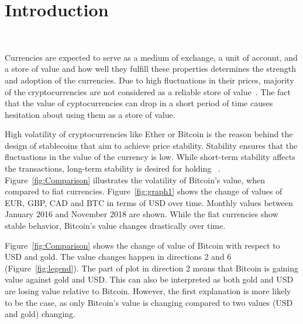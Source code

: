 \section{Introduction}\label{Intro}
~

Currencies are expected to serve as a medium of exchange, a unit of account, and a store of value and how well they fulfill these properties determines the strength and adoption of the currencies. Due to high fluctuations in their prices, majority of the cryptocurrencies are not considered as a reliable store of value~\cite{overview}. The fact that the value of cyptocurrencies can drop in a short period of time causes hesitation about using them as a store of value.

High volatility of cryptocurrencies like Ether or Bitcoin is the reason behind the design of stablecoins that aim to achieve price stability. Stability ensures that the fluctuations in the value of the currency is low. While short-term stability affects the transactions, long-term stability is desired for holding ~\cite{forbes}. Figure~\ref{fig:Comparison} illustrates the volatility of Bitcoin's value, when compared to fiat currencies. Figure~\ref{fig:graph1} shows the change of values of EUR, GBP, CAD and BTC in terms of USD over time. Monthly values between January 2016 and November 2018 are shown. While the fiat currencies show stable behavior, Bitcoin's value changes drastically over time.

Figure~\ref{fig:Comparison} shows the change of value of Bitcoin with respect to USD and gold. The value changes happen in directions 2 and 6 (Figure~\ref{fig:legend}). The part of plot in direction 2 means that Bitcoin is gaining value against gold and USD. This can also be interpreted as both gold and USD are losing value relative to Bitcoin. However, the first explanation is more likely to be the case, as only Bitcoin's value is changing compared to two values (USD and gold) changing.


